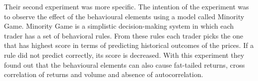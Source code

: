 Their second experiment was more specific. The intention of the experiment 
was to observe the effect of the behavioural elements using a model called
Minority Game. Minority Game is a simplistic decision-making system in
which each trader has a set of behavioral rules. From these rules each
trader picks the one that has highest score in terms of predicting 
historical outcomes of the prices. If a rule did not predict correctly,
its score is decreased. With this experiment they found out that the
behavioural elements can also cause fat-tailed returns, cross correlation 
of returns and volume and absence of autocorrelation.
